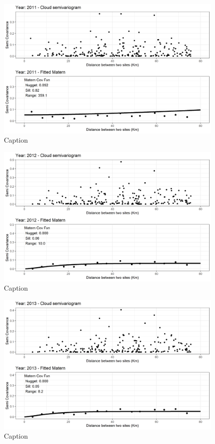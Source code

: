 \begin{figure}
    \centering
    \includegraphics{Figures/EmpiricalVariograms/Empirical_Variogram_2011.png}
    \caption{Caption}
    \label{fig:my_label}
\end{figure}

\begin{figure}
    \centering
    \includegraphics{Figures/EmpiricalVariograms/Empirical_Variogram_2012.png}
    \caption{Caption}
    \label{fig:my_label}
\end{figure}

\begin{figure}
    \centering
    \includegraphics{Figures/EmpiricalVariograms/Empirical_Variogram_2013.png}
    \caption{Caption}
    \label{fig:my_label}
\end{figure}


